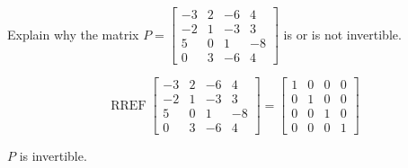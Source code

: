 
\begin{exerciseStatement}


Explain why the matrix \(P= \left[\begin{array}{cccc}
-3 & 2 & -6 & 4 \\
-2 & 1 & -3 & 3 \\
5 & 0 & 1 & -8 \\
0 & 3 & -6 & 4
\end{array}\right] \) is or is not invertible.


\end{exerciseStatement}
    
\begin{exerciseAnswer} 


\[\operatorname{RREF} \left[\begin{array}{cccc}
-3 & 2 & -6 & 4 \\
-2 & 1 & -3 & 3 \\
5 & 0 & 1 & -8 \\
0 & 3 & -6 & 4
\end{array}\right] = \left[\begin{array}{cccc}
1 & 0 & 0 & 0 \\
0 & 1 & 0 & 0 \\
0 & 0 & 1 & 0 \\
0 & 0 & 0 & 1
\end{array}\right] \]

\(P\) is invertible.
\end{exerciseAnswer}
    

